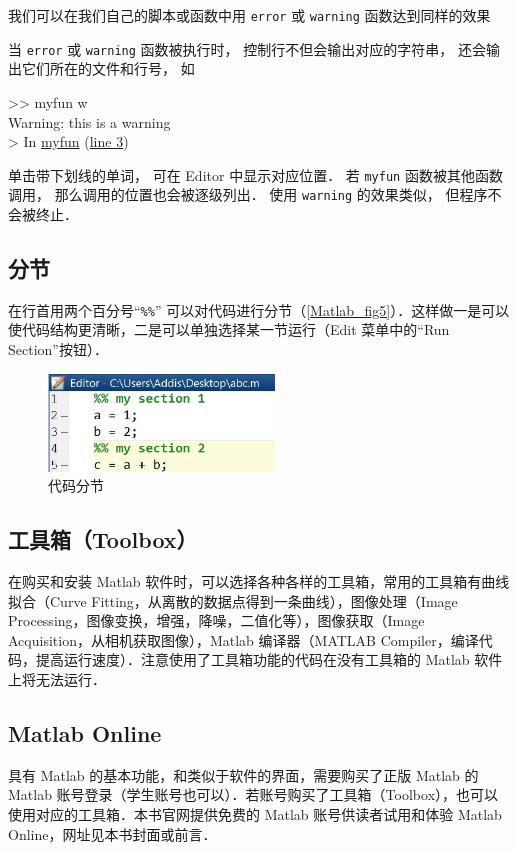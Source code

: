 我们可以在我们自己的脚本或函数中用 \texttt{error} 或 \texttt{warning} 函数达到同样的效果

当 \texttt{error} 或 \texttt{warning} 函数被执行时， 控制行不但会输出对应的字符串， 还会输出它们所在的文件和行号， 如
\begin{Command}
>> myfun w\\
{\color{warning}Warning: this is a warning\\
> In \underline{myfun} (\underline{line 3})}
\end{Command}
单击带下划线的单词， 可在 Editor 中显示对应位置． 若 \texttt{myfun} 函数被其他函数调用， 那么调用的位置也会被逐级列出． 使用 \texttt{warning} 的效果类似， 但程序不会被终止．

\subsection{分节}
在行首用两个百分号“\texttt{\%\%}” 可以对代码进行分节（\autoref{Matlab_fig5}）．这样做一是可以使代码结构更清晰，二是可以单独选择某一节运行（Edit 菜单中的“Run Section”按钮）．
\begin{figure}[ht]
\centering
\includegraphics[width= 6cm]{./figures/Matlab5.pdf}
\caption{代码分节}\label{Matlab_fig5}
\end{figure}

\subsection{工具箱（Toolbox）}
在购买和安装 Matlab 软件时，可以选择各种各样的工具箱，常用的工具箱有曲线拟合（Curve Fitting，从离散的数据点得到一条曲线），图像处理（Image Processing，图像变换，增强，降噪，二值化等），图像获取（Image Acquisition，从相机获取图像），Matlab 编译器（MATLAB Compiler，编译代码，提高运行速度）．注意使用了工具箱功能的代码在没有工具箱的 Matlab 软件上将无法运行．

\subsection{Matlab Online}
具有 Matlab 的基本功能，和类似于软件的界面，需要购买了正版 Matlab 的 Matlab 账号登录（学生账号也可以）．若账号购买了工具箱（Toolbox），也可以使用对应的工具箱．本书官网提供免费的 Matlab 账号供读者试用和体验 Matlab Online，网址见本书封面或前言．



